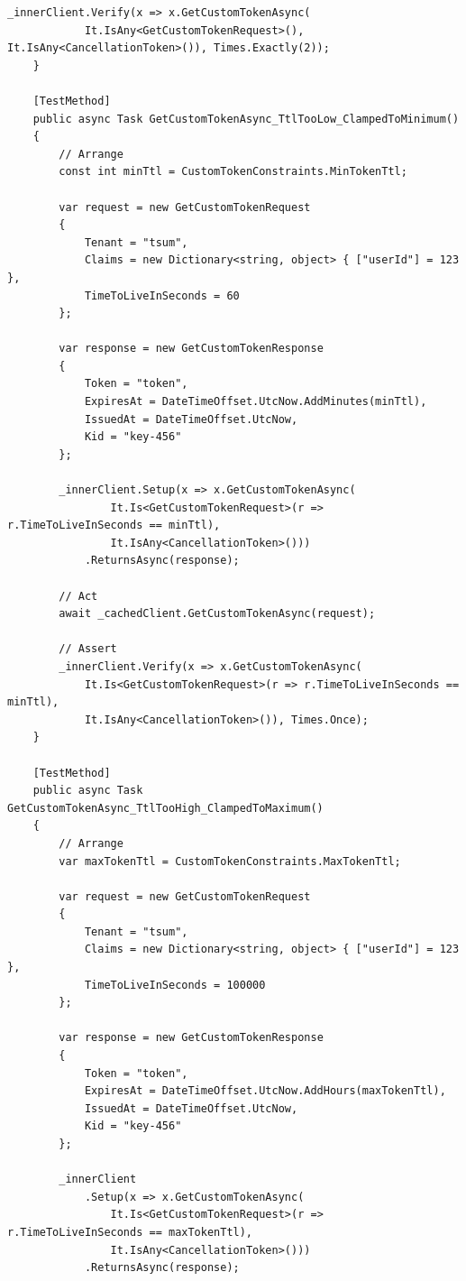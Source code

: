 \begin{lstlisting}[language={[Sharp]C},
  label={lst:app-cached-client-tests},
  caption={Класс CachedAuthJwtClientTests: набор юнит-тестов для кеширующего клиента}]
        _innerClient.Verify(x => x.GetCustomTokenAsync(
            It.IsAny<GetCustomTokenRequest>(), It.IsAny<CancellationToken>()), Times.Exactly(2));
    }

    [TestMethod]
    public async Task GetCustomTokenAsync_TtlTooLow_ClampedToMinimum()
    {
        // Arrange
        const int minTtl = CustomTokenConstraints.MinTokenTtl;

        var request = new GetCustomTokenRequest
        {
            Tenant = "tsum",
            Claims = new Dictionary<string, object> { ["userId"] = 123 },
            TimeToLiveInSeconds = 60
        };

        var response = new GetCustomTokenResponse
        {
            Token = "token",
            ExpiresAt = DateTimeOffset.UtcNow.AddMinutes(minTtl),
            IssuedAt = DateTimeOffset.UtcNow,
            Kid = "key-456"
        };

        _innerClient.Setup(x => x.GetCustomTokenAsync(
                It.Is<GetCustomTokenRequest>(r => r.TimeToLiveInSeconds == minTtl),
                It.IsAny<CancellationToken>()))
            .ReturnsAsync(response);

        // Act
        await _cachedClient.GetCustomTokenAsync(request);

        // Assert
        _innerClient.Verify(x => x.GetCustomTokenAsync(
            It.Is<GetCustomTokenRequest>(r => r.TimeToLiveInSeconds == minTtl),
            It.IsAny<CancellationToken>()), Times.Once);
    }

    [TestMethod]
    public async Task GetCustomTokenAsync_TtlTooHigh_ClampedToMaximum()
    {
        // Arrange
        var maxTokenTtl = CustomTokenConstraints.MaxTokenTtl;

        var request = new GetCustomTokenRequest
        {
            Tenant = "tsum",
            Claims = new Dictionary<string, object> { ["userId"] = 123 },
            TimeToLiveInSeconds = 100000
        };

        var response = new GetCustomTokenResponse
        {
            Token = "token",
            ExpiresAt = DateTimeOffset.UtcNow.AddHours(maxTokenTtl),
            IssuedAt = DateTimeOffset.UtcNow,
            Kid = "key-456"
        };

        _innerClient
            .Setup(x => x.GetCustomTokenAsync(
                It.Is<GetCustomTokenRequest>(r => r.TimeToLiveInSeconds == maxTokenTtl),
                It.IsAny<CancellationToken>()))
            .ReturnsAsync(response);


\end{lstlisting}

